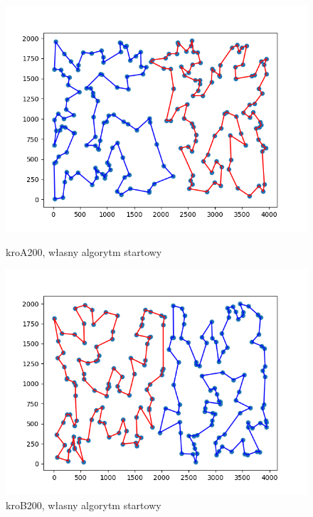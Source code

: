 \documentclass[11pt]{article}
\begin{document}
\begin{figure}[H]
    \vspace{0.5cm}

    \begin{minipage}[t]{0.45\textwidth}
        \centering
        \includegraphics[width=\linewidth]{best_paths/kroA200/traverse_steepest_both/split_paths_regret_TSP.png}
        \caption{kroA200, własny algorytm startowy}
    \end{minipage}
    \hfill
    \begin{minipage}[t]{0.45\textwidth}
        \centering
        \includegraphics[width=\linewidth]{best_paths/kroB200/traverse_steepest_both/split_paths_regret_TSP.png}
        \caption{kroB200, własny algorytm startowy}
    \end{minipage}
    \label{fig:minipage-steepest-both}
\end{figure}
\end{document}
